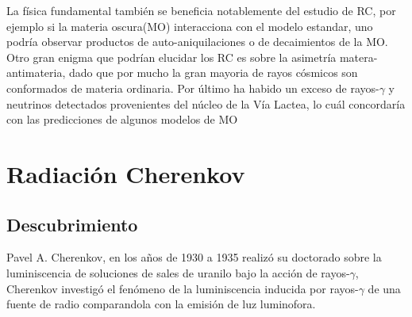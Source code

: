 La física fundamental también se beneficia notablemente del estudio de RC, por ejemplo si la materia oscura(MO) interacciona con el modelo estandar, uno podría observar productos de auto-aniquilaciones o de decaimientos de la MO. Otro gran enigma que podrían elucidar los RC es sobre la asimetría matera-antimateria, dado que por mucho la gran mayoria de rayos cósmicos son conformados de materia ordinaria. Por último ha habido un exceso de rayos-$\gamma$ y neutrinos detectados provenientes del núcleo de la Vía Lactea, lo cuál concordaría con las predicciones de algunos modelos de MO \cite{Workman:2022ynf}\\



\section{Radiación Cherenkov}
\subsection{Descubrimiento}
Pavel A. Cherenkov, en los años de 1930 a 1935 realizó su doctorado sobre la luminiscencia de soluciones de sales de uranilo bajo la acción de rayos-$\gamma$, Cherenkov investigó el fenómeno de la luminiscencia inducida por rayos-$\gamma$ de una fuente de radio comparandola con la emisión de luz luminofora.\cite{CHERENKOVA20088}\\

